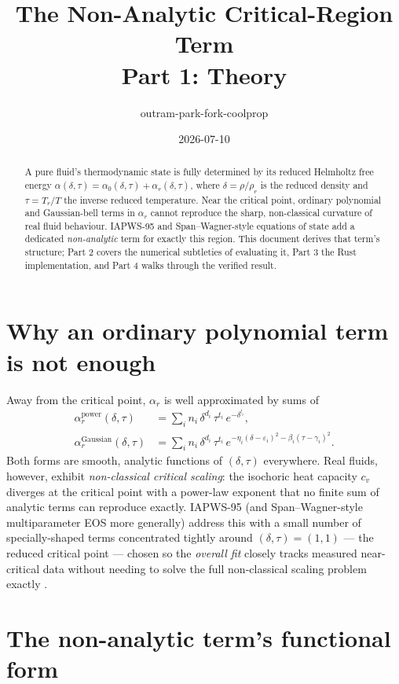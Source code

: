 \documentclass[11pt]{article}
\title{The Non-Analytic Critical-Region Term \\ \large Part 1: Theory}
\author{outram-park-fork-coolprop}
\date{2026-07-10}
\begin{document}
\maketitle

\begin{abstract}
A pure fluid's thermodynamic state is fully determined by its reduced
Helmholtz free energy $\alpha(\delta,\tau) = \alpha_0(\delta,\tau) +
\alpha_r(\delta,\tau)$, where $\delta = \rho/\rho_r$ is the reduced density
and $\tau = T_r/T$ the inverse reduced temperature. Near the critical point,
ordinary polynomial and Gaussian-bell terms in $\alpha_r$ cannot reproduce
the sharp, non-classical curvature of real fluid behaviour. IAPWS-95 and
Span--Wagner-style equations of state add a dedicated \emph{non-analytic}
term for exactly this region. This document derives that term's structure;
Part 2 covers the numerical subtleties of evaluating it, Part 3 the Rust
implementation, and Part 4 walks through the verified result.
\end{abstract}

\section{Why an ordinary polynomial term is not enough}

Away from the critical point, $\alpha_r$ is well approximated by sums of
\begin{align}
  \alpha_r^{\text{power}}(\delta,\tau) &= \sum_i n_i\, \delta^{d_i}\, \tau^{t_i}
    \, e^{-\delta^{l_i}}, \\
  \alpha_r^{\text{Gaussian}}(\delta,\tau) &= \sum_i n_i\, \delta^{d_i}\, \tau^{t_i}
    \, e^{-\eta_i(\delta-\varepsilon_i)^2 - \beta_i(\tau-\gamma_i)^2}.
\end{align}
Both forms are smooth, analytic functions of $(\delta,\tau)$ everywhere.
Real fluids, however, exhibit \emph{non-classical critical scaling}: the
isochoric heat capacity $c_v$ diverges at the critical point with a
power-law exponent that no finite sum of analytic terms can reproduce
exactly. IAPWS-95 (and Span--Wagner-style multiparameter EOS more generally)
address this with a small number of specially-shaped terms concentrated
tightly around $(\delta,\tau) = (1,1)$ — the reduced critical point — chosen
so the \emph{overall fit} closely tracks measured near-critical data without
needing to solve the full non-classical scaling problem exactly
\cite{wagner2002iapws}.

\section{The non-analytic term's functional form}
\end{document}
